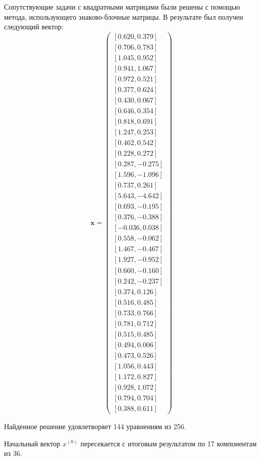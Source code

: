 Сопутствующие задачи с квадратными матрицами были решены с помощью метода, использующего знаково-блочные матрицы. В результате был получен следующий вектор:
\begin{equation}
\mathbf{x}=
\begin{pmatrix}
[0.620, 0.379] \\
[0.706, 0.783] \\
[1.045, 0.952] \\
[0.941, 1.067] \\
[0.972, 0.521] \\
[0.377, 0.624] \\
[0.430, 0.067] \\
[0.646, 0.354] \\
[0.818, 0.691] \\
[1.247, 0.253] \\
[0.462, 0.542] \\
[0.228, 0.272] \\
[0.287, -0.275] \\
[1.596, -1.096] \\ 
[0.737, 0.261] \\
[5.643, -4.642] \\
[0.693, -0.195] \\
[0.376, -0.388] \\
[-0.036, 0.038] \\
[0.558, -0.062] \\
[1.467, -0.467] \\
[1.927, -0.952] \\
[0.660, -0.160] \\
[0.242, -0.237] \\
[0.374, 0.126] \\
[0.516, 0.485] \\
[0.733, 0.766] \\
[0.781, 0.712] \\
[0.515, 0.485] \\
[0.494, 0.006] \\ 
[0.473, 0.526] \\
[1.056, 0.443] \\
[1.172, 0.827] \\
[0.928, 1.072] \\ 
[0.794, 0.704] \\
[0.388, 0.611]
\end{pmatrix}
\end{equation}

Найденное решение удовлетворяет 144 уравнениям из 256.

Начальный вектор $x^{(0)}$ пересекается с итоговым результатом по 17 компонентам из 36.